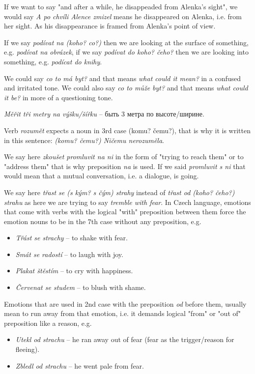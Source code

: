 \documentclass[12pt]{book}
\begin{document}
If we want to say "and after a while, he disappeaded from Alenka's sight", we would say \emph{A po chvíli Alence zmizel} 
means he disappeared on Alenka, i.e. from her sight. As his disappearance is framed from Alenka's point of view.

If we say \emph{podívat na (koho? co?)} then we are looking at the surface of something, e.g. \emph{podívat na obrázek},
if we say \emph{podívat do {koho? čeho?}} then we are looking into something, e.g. \emph{podícat do knihy}.

We could say \emph{co to má byt?} and that means \emph{what could it mean?} in a confused and irritated tone.
We could also say \emph{co to může byt?} and that means \emph{what could it be?} in more of a questioning tone.

\emph{Měřit tři metry na výšku/šířku} -- быть 3 метра по высоте/ширине.

Verb \emph{rozumět} expects a noun in 3rd case (komu? čemu?), that is why it is written in this sentence: 
\emph{(komu? čemu?) Ničemu nerozuměla}.

We say here \emph{zkoušet promluvit na ni} in the form of "trying to reach them" or to "address them" that is 
why preposition \emph{na} is used. If we said \emph{promluvit s ni} that would mean that a mutual conversation, 
i.e. a dialogue, is going.

We say here \emph{třast se (s kým? s čým) strahy} instead of \emph{třast od (koho? čeho?) strahu} as here we are 
trying to say \emph{tremble with fear}.
In Czech language, emotions that come with verbs with the logical "with" preposition between them force the emotion 
nouns to be in the 7th case without any preposition, e.g.
\begin{itemize}
    \item \emph{Třást se strachy} -- to shake with fear.
    \item \emph{Smát se radostí} -- to laugh with joy.
    \item \emph{Plakat štěstím} -- to cry with happiness.
    \item \emph{Červenat se studem} -- to blush with shame.
\end{itemize}

Emotions that are used in 2nd case with the preposition \emph{od} before them, usually mean to run away from that emotion, 
i.e. it demands logical "from" or "out of" preposition like a reason, e.g.
\begin{itemize}
    \item \emph{Utekl od strachu} -- he ran away out of fear (fear as the trigger/reason for fleeing).
    \item \emph{Zbledl od strachu} -- he went pale from fear.
\end{itemize}
\end{document}
